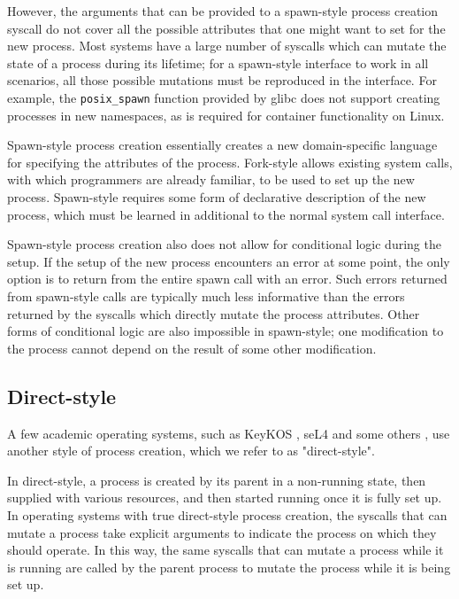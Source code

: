 \documentclass[sigplan]{acmart}
\begin{document}
However, the arguments that can be provided to a spawn-style process creation syscall
do not cover all the possible attributes that one might want to set for the new process.
Most systems have a large number of syscalls which can mutate the state of a process during its lifetime;
for a spawn-style interface to work in all scenarios,
all those possible mutations must be reproduced in the interface.
For example, the \texttt{posix\_spawn} function provided by glibc does not support creating processes in new namespaces,
as is required for container functionality on Linux.

Spawn-style process creation
essentially creates a new domain-specific language for specifying the attributes of the process.
Fork-style allows existing system calls,
with which programmers are already familiar,
to be used to set up the new process.
Spawn-style requires some form of declarative description of the new process,
which must be learned in additional to the normal system call interface.

Spawn-style process creation also does not allow for conditional logic during the setup.
If the setup of the new process encounters an error at some point,
the only option is to return from the entire spawn call with an error.
Such errors returned from spawn-style calls
are typically much less informative
than the errors returned by the syscalls which directly mutate the process attributes.
Other forms of conditional logic are also impossible in spawn-style;
one modification to the process cannot depend on the result of some other modification.
\subsection{Direct-style}
A few academic operating systems, such as KeyKOS \cite{keykos}, seL4 \cite{sel4}
and some others \cite{exokernel} \cite{fuschia} \cite{singularity},
use another style of process creation, which we refer to as "direct-style".

In direct-style, a process is created by its parent in a non-running state,
then supplied with various resources,
and then started running once it is fully set up.
In operating systems with true direct-style process creation,
the syscalls that can mutate a process
take explicit arguments to indicate the process on which they should operate.
In this way, the same syscalls that can mutate a process while it is running
are called by the parent process to mutate the process while it is being set up.
\end{document}
